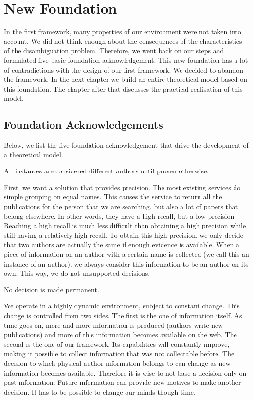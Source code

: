 \chapter{New Foundation}

In the first framework, many properties of our environment were not taken into account. We did not think enough about the consequences of the characteristics of the disambiguation problem. Therefore, we went back on our steps and formulated five basic foundation acknowledgement. This new foundation has a lot of contradictions with the design of our first framework. We decided to abandon the framework. In the next chapter we build an entire theoretical model based on this foundation. The chapter after that discusses the practical realisation of this model.

\section{Foundation Acknowledgements}

Below, we list the five foundation acknowledgement that drive the development of a theoretical model.

\begin{foundation}
\label{foundation:different}
All instances are considered different authors until proven otherwise.
\end{foundation}

First, we want a solution that provides precision. The most existing services do simple grouping on equal names. This causes the service to return all the publications for the person that we are searching, but also a lot of papers that belong elsewhere. In other words, they have a high recall, but a low precision. Reaching a high recall is much less difficult than obtaining a high precision while still having a relatively high recall. To obtain this high precision, we only decide that two authors are actually the same if enough evidence is available. When a piece of information on an author with a certain name is collected (we call this an instance of an author), we always consider this information to be an author on its own. This way, we do not unsupported decisions.

\begin{foundation}
\label{foundation:decision}
No decision is made permanent.
\end{foundation}

We operate in a highly dynamic environment, subject to constant change. This change is controlled from two sides. The first is the one of information itself. As time goes on, more and more information is produced (authors write new publications) and more of this information becomes available on the web. The second is the one of our framework. Its capabilities will constantly improve, making it possible to collect information that was not collectable before. The decision to which physical author information belongs to can change as new information becomes available. Therefore it is wise to not base a decision only on past information. Future information can provide new motives to make another decision. It has to be possible to change our minds though time.

